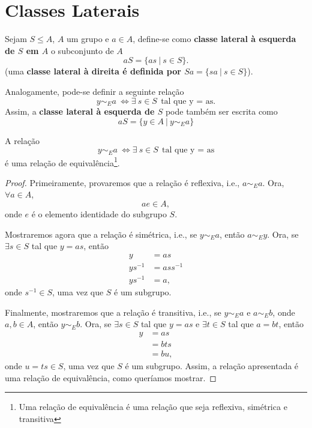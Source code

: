 \documentclass[11pt,openany]{book}
\begin{document}
    \chapter{Classes Laterais}

    \begin{definition}
    \label{def:classe_lateral}
        Sejam $S \leq A$, $A$ um grupo e $a \in A$, define-se como \textbf{classe lateral à esquerda de $S$ em $A$} o subconjunto de $A$
        \[aS = \{as \ | \ s \in S\}.\]
        (uma \textbf{classe lateral à direita é definida por $Sa = \{sa \ | \ s \in S\}$}).

        Analogamente, pode-se definir a seguinte relação
        \[y \sim_E a \ \Leftrightarrow \exists \ s \in S \ \ \text{tal que y = as}.\]
        Assim, a \textbf{classe lateral à esquerda de $S$} pode também ser escrita como
        \[aS = \{y \in A \ | \ y \sim_E a\}\]
    \end{definition}


    \begin{proposition}
        A relação \[y \sim_E a \ \Leftrightarrow \exists \ s \in S \ \ \text{tal que y = as}\] é uma relação de equivalência\footnote{Uma relação de equivalência é uma relação que seja reflexiva, simétrica e transitiva}.
    \end{proposition}
    
    \begin{proof}
        Primeiramente, provaremos que a relação é reflexiva, i.e., $a \sim_E a$. Ora, $\forall a \in A$,
        \[ae \in A,\]
        onde $e$ é o elemento identidade do subgrupo $S$.
    
        Mostraremos agora que a relação é simétrica, i.e., se $y \sim_E a$, então $a \sim_E y$. Ora, se $\exists s \in S$ tal que $y = as$, então
        \begin{align*}
            y &= as\\
            ys^{-1} &= ass^{-1}\\
            ys^{-1} &= a,
        \end{align*}
        onde $s^{-1} \in S$, uma vez que $S$ é um subgrupo.
    
        Finalmente, mostraremos que a relação é transitiva, i.e., se $y \sim_E a$ e $a \sim_E b$, onde $a,b \in A$, então $y \sim_E b$. Ora, se $\exists s \in S$ tal que $y = as$ e $\exists t \in S$ tal que $a = bt$, então
        \begin{align*}
            y &= as\\
            &= bts\\
            &= bu,
        \end{align*}
        onde $u = ts \in S$, uma vez que $S$ é um subgrupo.
        Assim, a relação apresentada é uma relação de equivalência, como queríamos mostrar.
    \end{proof}
\end{document}
